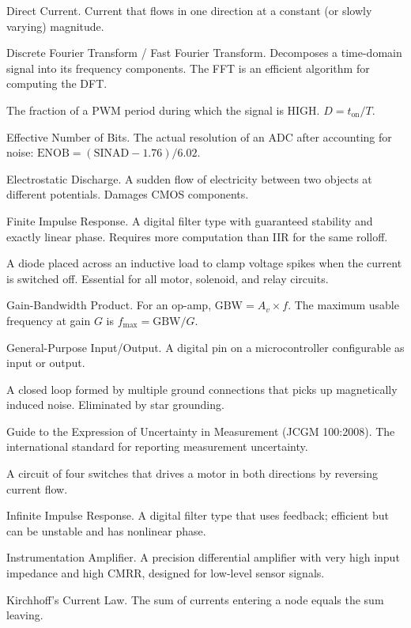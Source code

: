 \documentclass[11pt,letterpaper,twoside,openany]{book}
\begin{document}
\begin{description}[style=nextline,leftmargin=3em,font=\sffamily\bfseries]
\item[DC] Direct Current. Current that flows in one direction at a constant (or slowly varying) magnitude.
\item[DFT/FFT] Discrete Fourier Transform / Fast Fourier Transform. Decomposes a time-domain signal into its frequency components. The FFT is an efficient algorithm for computing the DFT.
\item[Duty Cycle ($D$)] The fraction of a PWM period during which the signal is HIGH. $D = t_{\text{on}}/T$.
\item[ENOB] Effective Number of Bits. The actual resolution of an ADC after accounting for noise: $\text{ENOB} = (\text{SINAD} - 1.76)/6.02$.
\item[ESD] Electrostatic Discharge. A sudden flow of electricity between two objects at different potentials. Damages CMOS components.
\item[FIR] Finite Impulse Response. A digital filter type with guaranteed stability and exactly linear phase. Requires more computation than IIR for the same rolloff.
\item[Flyback Diode] A diode placed across an inductive load to clamp voltage spikes when the current is switched off. Essential for all motor, solenoid, and relay circuits.
\item[GBW] Gain-Bandwidth Product. For an op-amp, $\text{GBW} = A_v \times f$. The maximum usable frequency at gain $G$ is $f_{\max} = \text{GBW}/G$.
\item[GPIO] General-Purpose Input/Output. A digital pin on a microcontroller configurable as input or output.
\item[Ground Loop] A closed loop formed by multiple ground connections that picks up magnetically induced noise. Eliminated by star grounding.
\item[GUM] Guide to the Expression of Uncertainty in Measurement (JCGM 100:2008). The international standard for reporting measurement uncertainty.
\item[H-Bridge] A circuit of four switches that drives a motor in both directions by reversing current flow.
\item[IIR] Infinite Impulse Response. A digital filter type that uses feedback; efficient but can be unstable and has nonlinear phase.
\item[INA] Instrumentation Amplifier. A precision differential amplifier with very high input impedance and high CMRR, designed for low-level sensor signals.
\item[KCL] Kirchhoff's Current Law. The sum of currents entering a node equals the sum leaving.

\end{description}
\end{document}
